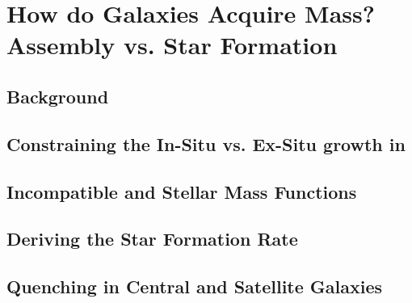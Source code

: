 
\chapter{How do Galaxies Acquire Mass? Assembly vs. Star Formation} %
\label{Chapter:GalGrowth}

\section{Background}

\section{Constraining the In-Situ vs. Ex-Situ growth in \steel}

\section{Incompatible \LCDM and Stellar Mass Functions}

\section{Deriving the Star Formation Rate}

\section{Quenching in Central and Satellite Galaxies}

